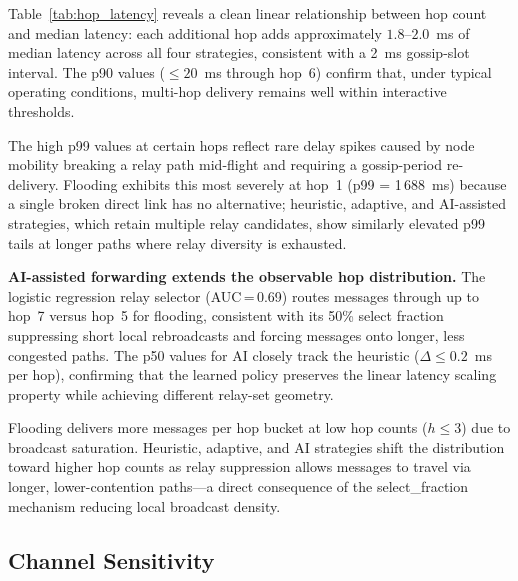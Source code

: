 \documentclass[conference]{IEEEtran}
\begin{document}
Table~\ref{tab:hop_latency} reveals a clean linear relationship between hop
count and median latency: each additional hop adds approximately
$1.8$--$2.0$~ms of median latency across all four strategies, consistent
with a 2~ms gossip-slot interval.  The p90 values ($\leq 20$~ms through hop~6)
confirm that, under typical operating conditions, multi-hop delivery remains
well within interactive thresholds.

The high p99 values at certain hops reflect rare delay spikes caused by node
mobility breaking a relay path mid-flight and requiring a gossip-period
re-delivery.  Flooding exhibits this most severely at hop~1 (p99 = 1\,688~ms)
because a single broken direct link has no alternative; heuristic, adaptive,
and AI-assisted strategies, which retain multiple relay candidates, show
similarly elevated p99 tails at longer paths where relay diversity is exhausted.

\textbf{AI-assisted forwarding extends the observable hop distribution.}
The logistic regression relay selector (AUC\,=\,0.69) routes messages through
up to hop~7 versus hop~5 for flooding, consistent with its 50\% select fraction
suppressing short local rebroadcasts and forcing messages onto longer, less
congested paths.  The p50 values for AI closely track the heuristic
($\Delta \leq 0.2$~ms per hop), confirming that the learned policy preserves
the linear latency scaling property while achieving different relay-set geometry.

Flooding delivers more messages per hop bucket at low hop counts ($h \leq 3$)
due to broadcast saturation.  Heuristic, adaptive, and AI strategies shift the
distribution toward higher hop counts as relay suppression allows messages to
travel via longer, lower-contention paths---a direct consequence of the
select\_fraction mechanism reducing local broadcast density.

\subsection{Channel Sensitivity}
\end{document}
